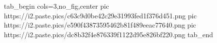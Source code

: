  
 
 
 
 


\ifcmt
  tab_begin cols=3,no_fig,center
		pic https://i2.paste.pics/c63c9d0be42c29e31993fed1f376d451.png
		pic https://i2.paste.pics/e590f43873595462b81f489eeac77640.png
		pic https://i2.paste.pics/dc8b32f4e876339f1122d95e826bf220.png
  tab_end
\fi
